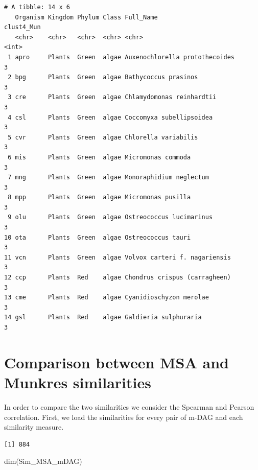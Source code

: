\documentclass[
  letterpaper,
  DIV=11,
  numbers=noendperiod]{scrreprt}
\newenvironment{Shaded}{}{}
\newcommand{\DecValTok}[1]{\textcolor[rgb]{0.82,0.60,0.40}{#1}}
\newcommand{\FunctionTok}[1]{\textcolor[rgb]{0.38,0.69,0.94}{#1}}
\newcommand{\NormalTok}[1]{\textcolor[rgb]{0.67,0.70,0.75}{#1}}
\newcommand{\OtherTok}[1]{\textcolor[rgb]{0.15,0.68,0.38}{#1}}
\newcommand{\SpecialCharTok}[1]{\textcolor[rgb]{0.34,0.71,0.76}{#1}}
\begin{document}
\begin{verbatim}
# A tibble: 14 x 6
   Organism Kingdom Phylum Class Full_Name                      clust4_Mun
   <chr>    <chr>   <chr>  <chr> <chr>                               <int>
 1 apro     Plants  Green  algae Auxenochlorella protothecoides          3
 2 bpg      Plants  Green  algae Bathycoccus prasinos                    3
 3 cre      Plants  Green  algae Chlamydomonas reinhardtii               3
 4 csl      Plants  Green  algae Coccomyxa subellipsoidea                3
 5 cvr      Plants  Green  algae Chlorella variabilis                    3
 6 mis      Plants  Green  algae Micromonas commoda                      3
 7 mng      Plants  Green  algae Monoraphidium neglectum                 3
 8 mpp      Plants  Green  algae Micromonas pusilla                      3
 9 olu      Plants  Green  algae Ostreococcus lucimarinus                3
10 ota      Plants  Green  algae Ostreococcus tauri                      3
11 vcn      Plants  Green  algae Volvox carteri f. nagariensis           3
12 ccp      Plants  Red    algae Chondrus crispus (carragheen)           3
13 cme      Plants  Red    algae Cyanidioschyzon merolae                 3
14 gsl      Plants  Red    algae Galdieria sulphuraria                   3
\end{verbatim}

\section{Comparison between MSA and Munkres
similarities}\label{comparison-between-msa-and-munkres-similarities}

In order to compare the two similarities we consider the Spearman and
Pearson correlation. First, we load the similarities for every pair of
m-DAG and each similarity measure.

\begin{Shaded}
\end{Shaded}

\begin{verbatim}
[1] 884
\end{verbatim}

\begin{Shaded}
\begin{Highlighting}[]
\FunctionTok{dim}\NormalTok{(Sim\_MSA\_mDAG)}
\end{Highlighting}
\end{Shaded}
\end{document}
